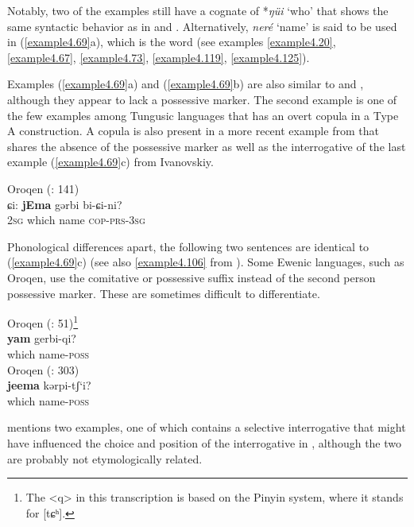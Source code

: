 \documentclass[output=paper,colorlinks,citecolor=brown]{langscibook}
\begin{document}
\noindent Notably, two of the examples still have a cognate of *\textit{ŋüi} ‘who’ that shows the same syntactic behavior as in  and . Alternatively, \textit{neré} `name' is said to be used in (\ref{example4.69}a), which is the  word (see examples \ref{example4.20}, \ref{example4.67}, \ref{example4.73}, \ref{example4.119}, \ref{example4.125}).


Examples (\ref{example4.69}a) and (\ref{example4.69}b) are also similar to  and , although they appear to lack a possessive marker. The second example is one of the few examples among Tungusic languages that has an overt copula in a Type A construction. A copula is also present in a more recent example from  that shares the absence of the possessive marker as well as the interrogative of the last example (\ref{example4.69}c) from Ivanovskiy.

\ea
    \label{example4.70}
     Oroqen (\citealt{ZhangLiZhang1989}: 141)\\
    \gll ɕi:		\textbf{jEma}	gərbi	bi-ɕi-ni?\\
    2\textsc{sg}		which	name	\textsc{cop-prs-3sg}\\
    \z

\noindent Phonological differences apart, the following two  sentences are identical to (\ref{example4.69}c) (see also \ref{example4.106} from ). Some Ewenic languages, such as Oroqen, use the comitative or possessive suffix instead of the second person possessive marker. These are sometimes difficult to differentiate.

\ea
    \label{example4.71}
     Oroqen (\citealt{Sa1981}: 51)\footnote{The <q> in this transcription is based on the  Pinyin system, where it stands for [tɕʰ].}\\
    \gll \textbf{yam}		gerbi-qi?\\
    which	name-\textsc{poss}\\
\ex
    \label{example4.72}
     Oroqen (\citealt{HanMeng1993}: 303)\\
    \gll \textbf{jeema}	kərpi-tʃ‘i?\\
    which	name-\textsc{poss}\\
\z

\citet[3]{Ivanovskiy1982} mentions two  examples, one of which contains a selective interrogative that might have influenced the choice and position of the interrogative in , although the two are probably not etymologically related.
\end{document}
